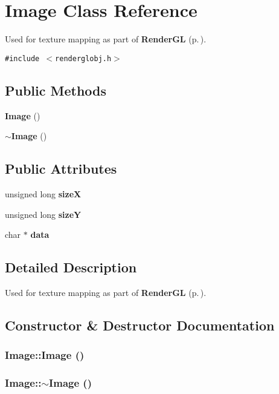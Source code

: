 \section{Image  Class Reference}
\label{classImage}
Used for texture mapping as part of {\bf Render\-GL} {\rm (p.\,\pageref{classRenderGL})}. 


{\tt \#include $<$renderglobj.h$>$}

\subsection*{Public Methods}
\begin{CompactItemize}
\item 
{\bf Image} ()
\item 
{\bf $\sim$Image} ()
\end{CompactItemize}
\subsection*{Public Attributes}
\begin{CompactItemize}
\item 
unsigned long {\bf size\-X}
\item 
unsigned long {\bf size\-Y}
\item 
char $\ast$ {\bf data}
\end{CompactItemize}


\subsection{Detailed Description}
Used for texture mapping as part of {\bf Render\-GL} {\rm (p.\,\pageref{classRenderGL})}.



\subsection{Constructor \& Destructor Documentation}
\subsubsection{\setlength{\rightskip}{0pt plus 5cm}Image::Image ()}\label{classImage_a0}


\subsubsection{\setlength{\rightskip}{0pt plus 5cm}Image::$\sim$Image ()}\label{classImage_a1}




